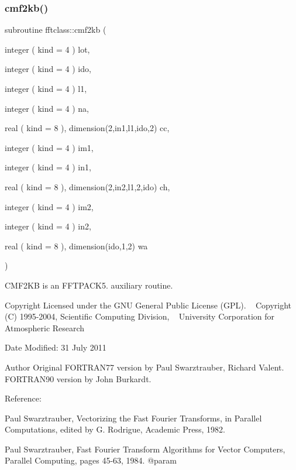 \subsubsection{\texorpdfstring{cmf2kb()}{cmf2kb()}}
{\footnotesize\ttfamily subroutine fftclass\+::cmf2kb (\begin{DoxyParamCaption}\item[{integer ( kind = 4 )}]{lot,  }\item[{integer ( kind = 4 )}]{ido,  }\item[{integer ( kind = 4 )}]{l1,  }\item[{integer ( kind = 4 )}]{na,  }\item[{real ( kind = 8 ), dimension(2,in1,l1,ido,2)}]{cc,  }\item[{integer ( kind = 4 )}]{im1,  }\item[{integer ( kind = 4 )}]{in1,  }\item[{real ( kind = 8 ), dimension(2,in2,l1,2,ido)}]{ch,  }\item[{integer ( kind = 4 )}]{im2,  }\item[{integer ( kind = 4 )}]{in2,  }\item[{real ( kind = 8 ), dimension(ido,1,2)}]{wa }\end{DoxyParamCaption})}



C\+M\+F2\+KB is an F\+F\+T\+P\+A\+C\+K5. auxiliary routine. 

\begin{DoxyCopyright}{Copyright}
Licensed under the G\+NU General Public License (G\+PL). ~\newline
 Copyright (C) 1995-\/2004, Scientific Computing Division, ~\newline
 University Corporation for Atmospheric Research 
\end{DoxyCopyright}
\begin{DoxyDate}{Date}
Modified\+: 31 July 2011 
\end{DoxyDate}
\begin{DoxyAuthor}{Author}
Original F\+O\+R\+T\+R\+A\+N77 version by Paul Swarztrauber, Richard Valent. ~\newline
 F\+O\+R\+T\+R\+A\+N90 version by John Burkardt.
\end{DoxyAuthor}
\begin{DoxyVerb}
  Reference:

    Paul Swarztrauber,
    Vectorizing the Fast Fourier Transforms,
    in Parallel Computations,
    edited by G. Rodrigue,
    Academic Press, 1982.

    Paul Swarztrauber,
    Fast Fourier Transform Algorithms for Vector Computers,
    Parallel Computing, pages 45-63, 1984. @param 
\end{DoxyVerb}
\mbox{\label{namespacefftclass_a87e04f91c6fd5a8be5cce797b134f4c3}} 
